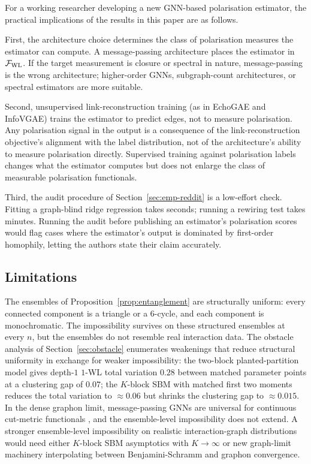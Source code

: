 For a working researcher developing a new GNN-based polarisation
estimator, the practical implications of the results in this paper
are as follows.

First, the architecture choice determines the class of
polarisation measures the estimator can compute. A message-passing
architecture places the estimator in $\mathcal{F}_{\mathrm{WL}}$. If the
target measurement is closure or spectral in nature, message-passing
is the wrong architecture; higher-order GNNs, subgraph-count
architectures, or spectral estimators are more suitable.

Second, unsupervised link-reconstruction training (as in EchoGAE and
InfoVGAE) trains the estimator to predict edges, not to measure
polarisation. Any polarisation signal in the output is a
consequence of the link-reconstruction objective's alignment with
the label distribution, not of the architecture's ability to
measure polarisation directly. Supervised training against
polarisation labels changes what the estimator computes but does
not enlarge the class of measurable polarisation functionals.

Third, the audit procedure of Section~\ref{sec:emp-reddit} is a
low-effort check. Fitting a graph-blind ridge regression takes
seconds; running a rewiring test takes minutes. Running the audit
before publishing an estimator's polarisation scores would flag
cases where the estimator's output is dominated by first-order
homophily, letting the authors state their claim accurately.

\subsection{Limitations}

The ensembles of Proposition~\ref{prop:entanglement} are structurally uniform:
every connected component is a triangle or a $6$-cycle, and each
component is monochromatic. The impossibility survives on these
structured ensembles at every $n$, but the ensembles do not resemble
real interaction data. The obstacle analysis of
Section~\ref{sec:obstacle} enumerates weakenings that reduce structural
uniformity in exchange for weaker impossibility: the two-block
planted-partition model gives depth-$1$ $1$-WL total variation
$0.28$ between matched parameter points at a clustering gap of
$0.07$; the $K$-block SBM with matched first two moments reduces the
total variation to $\approx 0.06$ but shrinks the clustering gap to
$\approx 0.015$. In the dense graphon limit, message-passing GNNs
are universal for continuous cut-metric functionals
\citep{KerivenPeyre2020}, and the ensemble-level impossibility does
not extend. A stronger ensemble-level impossibility on realistic
interaction-graph distributions would need either $K$-block SBM
asymptotics with $K \to \infty$ or new graph-limit machinery
interpolating between Benjamini-Schramm and graphon convergence.

